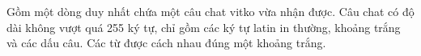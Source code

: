 Gồm một dòng duy nhất chứa một câu chat vitko vừa nhận được. Câu chat có độ dài không vượt quá 255 ký tự, chỉ gồm các ký tự latin in thường, khoảng trắng và các dấu câu. Các từ được cách nhau đúng một khoảng trắng.